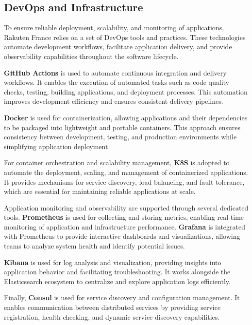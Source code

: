 \subsection{DevOps and Infrastructure}
\label{sec:rakuten-devops-tools}

To ensure reliable deployment, scalability, and monitoring of applications, Rakuten France relies on a set of DevOps tools and practices. These technologies automate development workflows, facilitate application delivery, and provide observability capabilities throughout the software lifecycle.

\textbf{GitHub Actions} is used to automate continuous integration and delivery workflows. It enables the execution of automated tasks such as code quality checks, testing, building applications, and deployment processes. This automation improves development efficiency and ensures consistent delivery pipelines.

\textbf{Docker} is used for containerization, allowing applications and their dependencies to be packaged into lightweight and portable containers. This approach ensures consistency between development, testing, and production environments while simplifying application deployment.

For container orchestration and scalability management, \textbf{\ac{K8S}} is adopted to automate the deployment, scaling, and management of containerized applications. It provides mechanisms for service discovery, load balancing, and fault tolerance, which are essential for maintaining reliable applications at scale.

Application monitoring and observability are supported through several dedicated tools. \textbf{Prometheus} is used for collecting and storing metrics, enabling real-time monitoring of application and infrastructure performance. \textbf{Grafana} is integrated with Prometheus to provide interactive dashboards and visualizations, allowing teams to analyze system health and identify potential issues.

\textbf{Kibana} is used for log analysis and visualization, providing insights into application behavior and facilitating troubleshooting. It works alongside the Elasticsearch ecosystem to centralize and explore application logs efficiently.

Finally, \textbf{Consul} is used for service discovery and configuration management. It enables communication between distributed services by providing service registration, health checking, and dynamic service discovery capabilities.

